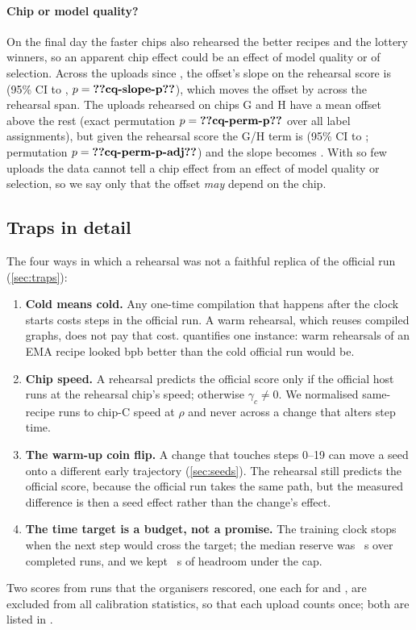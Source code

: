 \paragraph{Chip or model quality?} On the final day the faster chips also rehearsed the better recipes and the
lottery winners, so an apparent chip effect could be an effect of model quality or of selection. Across the
 uploads since , the offset's slope on the rehearsal score is  (95\% CI
 to , $p=\val{cq-slope-p}$), which moves the offset by  across
the rehearsal span. The  uploads rehearsed on chips G and H have a mean offset  above the
rest (exact permutation $p=\val{cq-perm-p}$ over all  label assignments), but given the rehearsal score
the G/H term is  (95\% CI  to ; permutation $p=\val{cq-perm-p-adj}$) and
the slope becomes . With so few uploads the data cannot tell a chip effect from an effect of model
quality or selection, so we say only that the offset \emph{may} depend on the chip.

\subsection{Traps in detail}
\label{app:traps}

The four ways in which a rehearsal was not a faithful replica of the official run (\cref{sec:traps}):
\begin{enumerate}
  \item \textbf{Cold means cold.} Any one-time compilation that happens after the clock starts costs steps in the
    official run. A warm rehearsal, which reuses compiled graphs, does not pay that cost. 
    quantifies one instance: warm rehearsals of an EMA recipe looked \docnum{} bpb better than the
    cold official run would be.
  \item \textbf{Chip speed.} A rehearsal predicts the official score only if the official host runs at the
    rehearsal chip's speed; otherwise $\gamma_c\neq0$. We normalised same-recipe runs to chip-C speed at $\rho$ and
    never across a change that alters step time.
  \item \textbf{The warm-up coin flip.} A change that touches steps 0--19 can move a seed onto a different early
    trajectory (\cref{sec:seeds}). The rehearsal still predicts the official score, because the official run takes
    the same path, but the measured difference is then a seed effect rather than the change's effect.
  \item \textbf{The time target is a budget, not a promise.} The training clock stops when the next step would
    cross the target; the median reserve was \docnum{}~s over  completed runs, and we
    kept \docnum{}~s of headroom under the cap.
\end{enumerate}
Two scores from runs that the organisers rescored, one each for  and , are excluded from all
calibration statistics, so that each upload counts once; both are listed in
.

